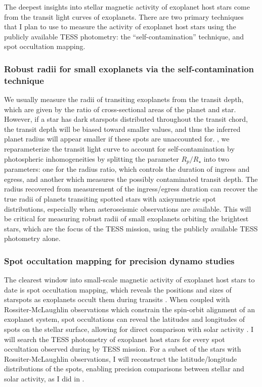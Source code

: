 The deepest insights into stellar magnetic activity of exoplanet host stars come from the transit light curves of exoplanets. There are two primary techniques that I plan to use to measure the activity of exoplanet host stars using the publicly available TESS photometry: the ``self-contamination'' technique, and spot occultation mapping. 

\subsubsection{Robust radii for small exoplanets via the self-contamination technique}

We usually measure the radii of transiting exoplanets from the transit depth, which are given by the ratio of cross-sectional areas of the planet and star. However, if a star has dark starspots distributed throughout the transit chord, the transit depth will be biased toward smaller values, and thus the inferred planet radius will appear smaller if these spots are unaccounted for. \citet{Morris2018f, Morris2018g}, we reparameterize the transit light curve to account for self-contamination by photospheric inhomogeneities by splitting the parameter $R_p/R_\star$ into two parameters: one for the radius ratio, which controls the duration of ingress and egress, and another which measures the possibly contaminated transit depth. The radius recovered from measurement of the ingress/egress duration can recover the true radii of planets transiting spotted stars with axisymmetric spot distributions, especially when asteroseismic observations are available. This will be critical for measuring robust radii of small exoplanets orbiting the brightest stars, which are the focus of the TESS mission, using the publicly available TESS photometry alone.

\subsubsection{Spot occultation mapping for precision dynamo studies}

The clearest window into small-scale magnetic activity of exoplanet host stars to date is spot occultation mapping, which reveals the positions and sizes of starspots as exoplanets occult them during transits \citep{Sanchis-Ojeda2011}. When coupled with Rossiter-McLaughlin observations which constrain the spin-orbit alignment of an exoplanet system, spot occultations can reveal the latitudes and longitudes of spots on the stellar surface, allowing for direct comparison with solar activity \citep{Winn2010, Morris2017a}. I will search the TESS photometry of exoplanet host stars for every spot occultation observed during by TESS mission. For a subset of the stars with Rossiter-McLaughlin observations, I will reconstruct the latitude/longitude distributions of the spots, enabling precision comparisons between stellar and solar activity, as I did in \citep{Morris2017a}. 

